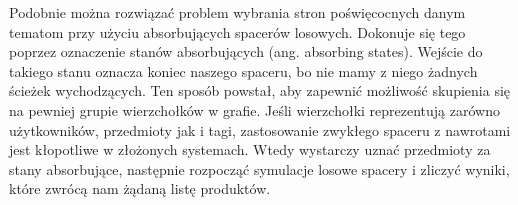 Podobnie można rozwiązać problem wybrania stron poświęcocnych danym tematom przy użyciu absorbujących spacerów losowych. Dokonuje się tego poprzez oznaczenie stanów absorbujących (ang. absorbing states).  Wejście do takiego stanu oznacza koniec naszego spaceru, bo nie mamy z niego żadnych ścieżek wychodzących. Ten sposób powstał, aby zapewnić możliwość skupienia się na pewniej grupie wierzchołków w grafie. Jeśli wierzchołki reprezentują zarówno użytkowników, przedmioty jak i tagi, zastosowanie zwykłego spaceru z nawrotami jest kłopotliwe w złożonych systemach. Wtedy wystarczy uznać przedmioty za stany absorbujące, następnie rozpocząć symulacje losowe spacery i zliczyć wyniki, które zwrócą nam żądaną listę produktów.
